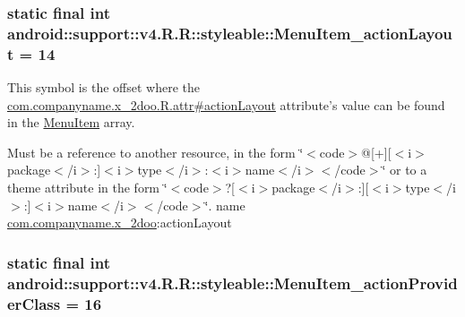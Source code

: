 \hypertarget{classandroid_1_1support_1_1v4_1_1_r_1_1styleable_a796f6f763b1b18c1f30a2dcfb9f5f72}{
\subsubsection[{MenuItem\_\-actionLayout}]{\setlength{\rightskip}{0pt plus 5cm}static final int android::support::v4.R.R::styleable::MenuItem\_\-actionLayout = 14}}
\label{classandroid_1_1support_1_1v4_1_1_r_1_1styleable_a796f6f763b1b18c1f30a2dcfb9f5f72}


This symbol is the offset where the \hyperlink{classcom_1_1companyname_1_1x__2doo_1_1_r_1_1attr_bf0534b297193a5e88ef2feb45f936ca}{com.companyname.x\_\-2doo.R.attr\#actionLayout} attribute's value can be found in the \hyperlink{classandroid_1_1support_1_1v4_1_1_r_1_1styleable_05493a7eeaa2bff09c4fbacbfb671ccc}{MenuItem} array.

Must be a reference to another resource, in the form \char`\"{}$<$code$>$@\mbox{[}+\mbox{]}\mbox{[}$<$i$>$package$<$/i$>$:\mbox{]}$<$i$>$type$<$/i$>$:$<$i$>$name$<$/i$>$$<$/code$>$\char`\"{} or to a theme attribute in the form \char`\"{}$<$code$>$?\mbox{[}$<$i$>$package$<$/i$>$:\mbox{]}\mbox{[}$<$i$>$type$<$/i$>$:\mbox{]}$<$i$>$name$<$/i$>$$<$/code$>$\char`\"{}.  name \hyperlink{namespacecom_1_1companyname_1_1x__2doo}{com.companyname.x\_\-2doo}:actionLayout \hypertarget{classandroid_1_1support_1_1v4_1_1_r_1_1styleable_4582e9564c219627c101073b05d99ca3}{
\subsubsection[{MenuItem\_\-actionProviderClass}]{\setlength{\rightskip}{0pt plus 5cm}static final int android::support::v4.R.R::styleable::MenuItem\_\-actionProviderClass = 16}}
\label{classandroid_1_1support_1_1v4_1_1_r_1_1styleable_4582e9564c219627c101073b05d99ca3}


